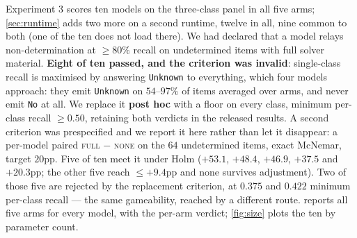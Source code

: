 \documentclass[10pt,twocolumn]{article}
\begin{document}
Experiment 3 scores ten models on the three-class panel in all five arms;
\cref{sec:runtime} adds two more on a second runtime, twelve in all, nine common
to both (one of the ten does not load there). We had
declared that a model relays non-determination at $\geq 80\%$ recall on
undetermined items with full solver material. \textbf{Eight of ten passed, and
the criterion was invalid}: single-class recall is maximised by answering \texttt{Unknown} to everything,
which four models approach: they emit \texttt{Unknown} on $54$--$97\%$ of items
averaged over arms, and never emit \texttt{No} at all. We replace it \textbf{post hoc} with a floor on every class, minimum per-class
recall $\geq 0.50$, retaining both verdicts in the released results. A second
criterion was prespecified and we report it here rather than let it disappear: a
per-model paired \textsc{full} $-$ \textsc{none} on the $64$ undetermined items,
exact McNemar, target $20$pp. Five of ten meet it under Holm ($+53.1$, $+48.4$,
$+46.9$, $+37.5$ and $+20.3$pp; the other five reach $\leq +9.4$pp and none
survives adjustment). Two of those five are rejected by the replacement criterion,
at $0.375$ and $0.422$ minimum per-class recall --- the same gameability, reached
by a different route.
 reports all five arms for every model, with the per-arm
verdict; \cref{fig:size} plots the ten by parameter count.
\end{document}
